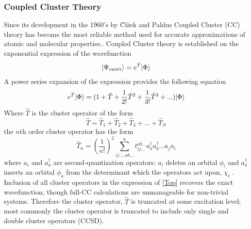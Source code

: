     \subsubsection{Coupled Cluster Theory}
      Since its development in the 1960's by {\u C}{\'i}{\u z}ek and Paldus \cite{Cizek1966,Cizek1969,Cizek1971} Coupled Cluster (CC) theory has become the most reliable method used for accurate approximations of atomic and molecular properties.\cite{Crawford2000}. Coupled Cluster theory is established on the exponential expression of the wavefunction
        \begin{equation}
          | \Psi_{\text{exact}} \rangle = e^{\hat{T}}| \Phi \rangle
        \end{equation}
      A power series expansion of the expression provides the following equation
        \begin{equation} \label{exans}
          e^{\hat{T}}| \Phi \rangle = (1 + \hat{T} + \frac{1}{2!} \hat{T}^2 + \frac{1}{3!} \hat{T}^3 + ...) | \Phi \rangle
        \end{equation}
      Where $\hat{T}$ is the cluster operator of the form 
        \begin{equation}\label{Top}
          \hat{T} = \hat{T}_1 + \hat{T}_2 + \hat{T}_3 + ... + \hat{T}_N
        \end{equation}
      the $n$th order cluster operator has the form 
        \begin{equation}\label{Tn}
          \hat{T}_n = \left(\frac{1}{n!}\right)^2 \sum_{ij\dots,ab\dots}^{n} t_{ij\dots}^{ab\dots} a^\dagger_a a^\dagger_b \dots a_j a_i 
        \end{equation}
      where $a_i$ and $a^\dagger_a$ are second-quantization operators: $a_i$ deletes an orbital $\phi_i$ and $a^\dagger_a$ inserts an orbital $\phi_a$ from the determinant which the operators act upon, $\chi_l$ %
      \cite{Crawford2000,Bartlett2007}.
      Inclusion of all cluster operators in the expression of \cref{Top} recovers the exact wavefunction, though full-CC calculations are unmanageable for non-trivial systems. Therefore the cluster operator, $\hat{T}$ is truncated at some excitation level; most commonly the cluster operator is truncated to include only single and double cluster operators (CCSD).
